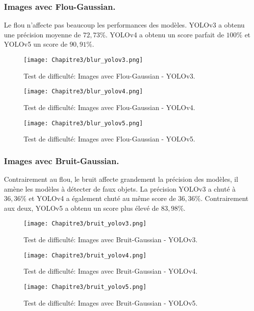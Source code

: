           \subsubsection{Images avec Flou-Gaussian.}
          Le flou n'affecte pas beaucoup les performances des modèles. YOLOv3 a obtenu une précision moyenne de $72,73\%$. YOLOv4 a obtenu un score parfait de $100\%$ et YOLOv5 un score de $90,91\%$.
          \begin{figure}[H]
                    \centering
                    \texttt{[image: Chapitre3/blur\_yolov3.png]}
                    \caption{Test de difficulté: Images avec Flou-Gaussian - YOLOv3.}
                    \label{y3_blur}
                    \end{figure}
          \begin{figure}[H]
                    \centering
                    \texttt{[image: Chapitre3/blur\_yolov4.png]}
                    \caption{Test de difficulté: Images avec Flou-Gaussian - YOLOv4.}
                    \label{y4_blur}
                    \end{figure}
          \begin{figure}[H]
                    \centering
                    \texttt{[image: Chapitre3/blur\_yolov5.png]}
                    \caption{Test de difficulté: Images avec Flou-Gaussian - YOLOv5.}
                    \label{y5_blur}
                    \end{figure}

          \subsubsection{Images avec Bruit-Gaussian.}
          Contrairement au flou, le bruit affecte grandement la précision des modèles, il amène les modèles à détecter de faux objets.
          La précision YOLOv3 a chuté à $36,36\%$ et YOLOv4 a également chuté au même score de $36,36\%$. Contrairement aux deux, YOLOv5 a obtenu un score plus élevé de $83,98\%$.
          \begin{figure}[H]
                    \centering
                    \texttt{[image: Chapitre3/bruit\_yolov3.png]}
                    \caption{Test de difficulté: Images avec Bruit-Gaussian - YOLOv3.}
                    \label{bruit_y3}
                    \end{figure}
          \begin{figure}[H]
                    \centering
                    \texttt{[image: Chapitre3/bruit\_yolov4.png]}
                    \caption{Test de difficulté: Images avec Bruit-Gaussian - YOLOv4.}
                    \label{bruit_y4}
                    \end{figure}
          \begin{figure}[H]
                    \centering
                    \texttt{[image: Chapitre3/bruit\_yolov5.png]}
                    \caption{Test de difficulté: Images avec Bruit-Gaussian - YOLOv5.}
                    \label{bruit_y5}
                    \end{figure}
